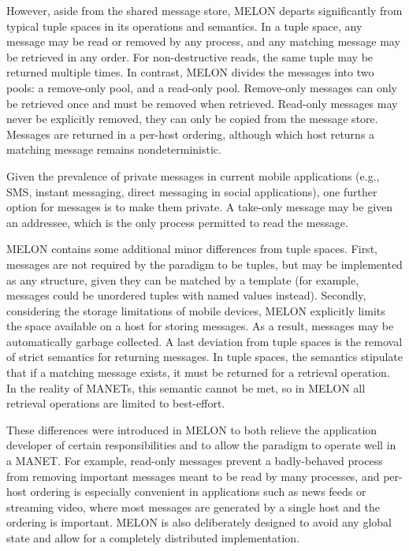 \documentclass{llncs}
\begin{document}
However, aside from the shared message store, MELON departs significantly from typical tuple spaces in its operations and semantics. In a tuple space, any message may be read or removed by any process, and any matching message may be retrieved in any order. For non-destructive reads, the same tuple may be returned multiple times. In contrast, MELON divides the messages into two pools: a remove-only pool, and a read-only pool. Remove-only messages can only be retrieved once and must be removed when retrieved. Read-only messages may never be explicitly removed, they can only be copied from the message store. Messages are returned in a per-host ordering, although which host returns a matching message remains nondeterministic.

Given the prevalence of private messages in current mobile applications (e.g., SMS, instant messaging, direct messaging in social applications), one further option for messages is to make them private. A take-only message may be given an addressee, which is the only process permitted to read the message.

MELON contains some additional minor differences from tuple spaces. First, messages are not required by the paradigm to be tuples, but may be implemented as any structure, given they can be matched by a template (for example, messages could be unordered tuples with named values instead). Secondly, considering the storage limitations of mobile devices, MELON explicitly limits the space available on a host for storing messages. As a result, messages may be automatically garbage collected. A last deviation from tuple spaces is the removal of strict semantics for returning messages. In tuple spaces, the semantics stipulate that if a matching message exists, it must be returned for a retrieval operation. In the reality of MANETs, this semantic cannot be met, so in MELON all retrieval operations are limited to best-effort.

These differences were introduced in MELON to both relieve the application developer of certain responsibilities and to allow the paradigm to operate well in a MANET. For example, read-only messages prevent a badly-behaved process from removing important messages meant to be read by many processes, and per-host ordering is especially convenient in applications such as news feeds or streaming video, where most messages are generated by a single host and the ordering is important. MELON is also deliberately designed to avoid any global state and allow for a completely distributed implementation.
\end{document}

